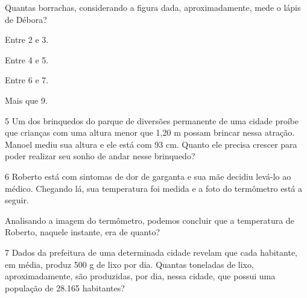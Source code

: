 {Quantas borrachas, considerando a figura dada, aproximadamente, mede o
lápis de Débora?

\begin{escolha}
\item
  Entre 2 e 3.
\item
  Entre 4 e 5.
\item
  Entre 6 e 7.
\item
  Mais que 9.
\end{escolha}


\num{5} Um dos brinquedos do parque de diversões permanente de uma cidade
proíbe que crianças com uma altura menor que 1,20 m possam brincar nessa
atração. Manoel mediu sua altura e ele está com 93 cm. Quanto ele
precisa crescer para poder realizar seu sonho de andar nesse brinquedo?



\num{6} Roberto está com sintomas de dor de garganta e sua mãe decidiu levá-lo ao
médico. Chegando lá, sua temperatura foi medida e a foto do termômetro
está a seguir.


Analisando a imagem do termômetro, podemos concluir que a temperatura de
Roberto, naquele instante, era de quanto?


\num{7} Dados da prefeitura de uma determinada cidade revelam que cada
habitante, em média, produz 500 g de lixo por dia. Quantas toneladas de lixo,
aproximadamente, são produzidas, por dia, nessa cidade, que
possui uma população de 28.165 habitantes?



}
